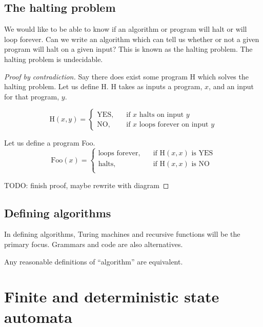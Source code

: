 \documentclass{article}
\begin{document}
\subsection{The halting problem}
We would like to be able to know if an algorithm or program
will halt or will loop forever.
Can we write an algorithm which can tell us whether or not
a given program will halt on a given input?
This is known as the halting problem.
The halting problem is undecidable.
\begin{proof}[Proof by contradiction]
    Say there does exist some program H which solves the halting problem.
    Let us define H.
    H takes as inputs a program, \(x\),
    and an input for that program, \(y\).

    \[
        \text{H}(x,y) =
        \begin{cases}
            \text{YES}, \quad & \text{if } x \text{ halts on input } y         \\
            \text{NO},        & \text{if } x \text{ loops forever on input } y
        \end{cases}
    \]

    Let us define a program Foo.
    \[
        \text{Foo}(x) =
        \begin{cases}
            \text{loops forever}, \quad & \text{if } \text{H}(x,x) \text{ is YES} \\
            \text{halts}, \quad         & \text{if } \text{H}(x,x) \text{ is NO}  \\
        \end{cases}
    \]

    TODO: finish proof, maybe rewrite with diagram
\end{proof}

\subsection{Defining algorithms}
In defining algorithms, Turing machines
and recursive functions will be the primary focus.
Grammars and code are also alternatives.
\begin{definition}
    Any reasonable definitions of ``algorithm'' are equivalent.
\end{definition}
\newpage
\section{Finite and deterministic state automata}
\end{document}
